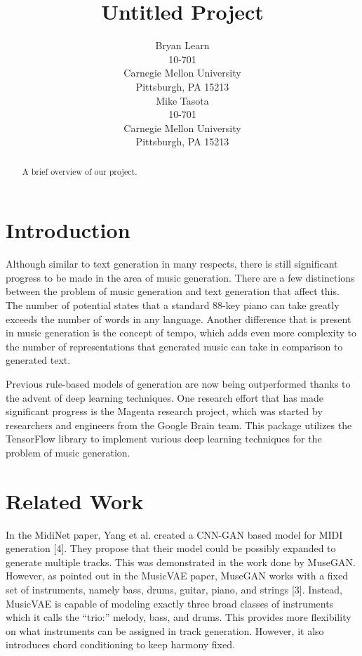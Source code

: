 \documentclass{article}
\title{Untitled Project}
\author{
  Bryan Learn\\
  10-701\\
  Carnegie Mellon University\\
  Pittsburgh, PA 15213\\
  \And
  Mike Tasota\\
  10-701\\
  Carnegie Mellon University\\
  Pittsburgh, PA 15213\\
}
\begin{document}

\maketitle


\begin{abstract}
  A brief overview of our project.
\end{abstract}


\section{Introduction}


Although similar to text generation in many respects, there is still significant progress to be made in the area of music generation. There are a few distinctions between the problem of music generation and text generation that affect this. The number of potential states that a standard 88-key piano can take greatly exceeds the number of words in any language. Another difference that is present in music generation is the concept of tempo, which adds even more complexity to the number of representations that generated music can take in comparison to generated text.

Previous rule-based models of generation are now being outperformed thanks to the advent of deep learning techniques. One research effort that has made significant progress is the Magenta research project, which was started by researchers and engineers from the Google Brain team. This package utilizes the TensorFlow library to implement various deep learning techniques for the problem of music generation.


\section{Related Work}


In the MidiNet paper, Yang et al. created a CNN-GAN based model for MIDI generation [4]. They propose that their model could be possibly expanded to generate multiple tracks. This was demonstrated in the work done by MuseGAN. However, as pointed out in the MusicVAE paper, MuseGAN works with a fixed set of instruments, namely bass, drums, guitar, piano, and strings [3]. Instead, MusicVAE is capable of modeling exactly three broad classes of instruments which it calls the “trio:” melody, bass, and drums. This provides more flexibility on what instruments can be assigned in track generation. However, it also introduces chord conditioning to keep harmony fixed.
\end{document}
